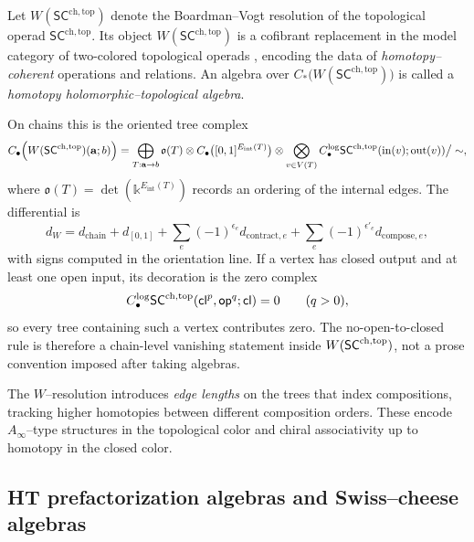 \begin{definition}
\label{def:WSC}
Let $W(\mathsf{SC}^{\mathrm{ch,top}})$ denote the Boardman--Vogt resolution of the
topological operad $\mathsf{SC}^{\mathrm{ch,top}}$.
Its object $W(\mathsf{SC}^{\mathrm{ch,top}})$ is a cofibrant replacement in the model category of two-colored topological operads \cite{BM03,CM14}, encoding
the data of \emph{homotopy--coherent} operations and relations.
An algebra over $C_\ast\!\bigl(W(\mathsf{SC}^{\mathrm{ch,top}})\bigr)$ is called a
\emph{homotopy holomorphic--topological algebra}.

On chains this is the oriented tree complex
\[
C_\bullet\!\left(W(\mathsf{SC}^{\mathrm{ch},\mathrm{top}})(\mathbf a;b)\right)
=
\bigoplus_{T:\mathbf a\to b}
\mathfrak{o}(T)\otimes
C_\bullet\bigl([0,1]^{E_{\mathrm{int}}(T)}\bigr)
\otimes
\bigotimes_{v\in V(T)}
C_\bullet^{\log}\mathsf{SC}^{\mathrm{ch},\mathrm{top}}(\mathrm{in}(v);\mathrm{out}(v))
\big/ \sim,
\]
where
\(\mathfrak{o}(T)=\det(\mathbb{k}^{E_{\mathrm{int}}(T)})\)
records an ordering of the internal edges. The differential is
\[
d_W=d_{\mathrm{chain}}+d_{[0,1]}
+\sum_e(-1)^{\epsilon_e}d_{\mathrm{contract},e}
+\sum_e(-1)^{\epsilon'_e}d_{\mathrm{compose},e},
\]
with signs computed in the orientation line. If a vertex has closed
output and at least one open input, its decoration is the zero complex
\[
C_\bullet^{\log}\mathsf{SC}^{\mathrm{ch},\mathrm{top}}(\mathsf{cl}^{p},\mathsf{op}^{q};\mathsf{cl})
=0\qquad(q>0),
\]
so every tree containing such a vertex contributes zero. The
no-open-to-closed rule is therefore a chain-level vanishing statement
inside \(W(\mathsf{SC}^{\mathrm{ch},\mathrm{top}})\), not a prose convention imposed after taking
algebras.
\end{definition}

\begin{remark}
\label{rmk:W-homotopy}
The $W$--resolution introduces \emph{edge lengths} on the trees that index compositions,
tracking higher homotopies between different composition orders.
These encode $A_\infty$--type structures in the topological color
and chiral associativity up to homotopy in the closed color.
\end{remark}

\subsection{HT prefactorization algebras and Swiss--cheese algebras}
\label{subsec:prefact-vs-operad}


